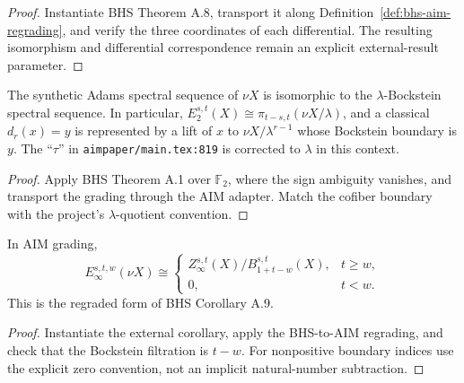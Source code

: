 \begin{proof}
  Instantiate BHS Theorem A.8, transport it along
  Definition~\ref{def:bhs-aim-regrading}, and verify the three coordinates of
  each differential.  The resulting isomorphism and differential
  correspondence remain an explicit external-result parameter.
\end{proof}

\begin{theorem}
  \label{thm:external-lambda-bockstein}
  \notready
  The synthetic Adams spectral sequence of $\nu X$ is isomorphic to the
  $\lambda$-Bockstein spectral sequence.  In particular,
  $E_2^{s,t}(X)\cong\pi_{t-s,t}(\nu X/\lambda)$, and a classical
  $d_r(x)=y$ is represented by a lift of $x$ to
  $\nu X/\lambda^{r-1}$ whose Bockstein boundary is $y$.  The ``$\tau$'' in
  \texttt{aimpaper/main.tex:819} is corrected to $\lambda$ in this context.
\end{theorem}

\begin{proof}
  Apply BHS Theorem A.1 over $\mathbb F_2$, where the sign ambiguity vanishes,
  and transport the grading through the AIM adapter.  Match the cofiber
  boundary with the project's $\lambda$-quotient convention.
\end{proof}

\begin{theorem}[$E_\infty$ of $\nu X$]
  \label{thm:external-synthetic-einfty-nu}
  \notready
  In AIM grading,
  \[
    E_\infty^{s,t,w}(\nu X)\cong
    \begin{cases}
      Z_\infty^{s,t}(X)/B_{1+t-w}^{s,t}(X),&t\ge w,\\
      0,&t<w.
    \end{cases}
  \]
  This is the regraded form of BHS Corollary A.9.
\end{theorem}

\begin{proof}
  Instantiate the external corollary, apply the BHS-to-AIM regrading, and
  check that the Bockstein filtration is $t-w$.  For nonpositive boundary
  indices use the explicit zero convention, not an implicit natural-number
  subtraction.
\end{proof}

